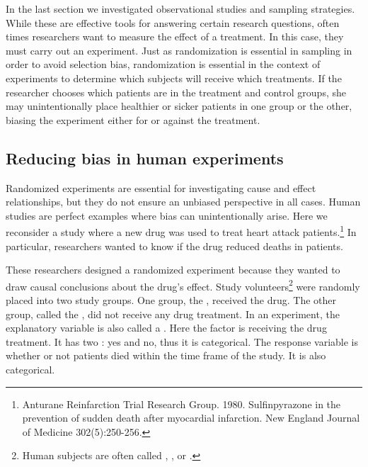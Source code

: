 In the last section we investigated observational studies and sampling strategies. While these are effective tools for answering certain research questions, often times researchers want to measure the effect of a treatment. In this case, they must carry out an experiment. Just as randomization is essential in sampling in order to avoid selection bias, randomization is essential in the context of experiments to determine which subjects will receive which treatments. If the researcher chooses which patients are in the treatment and control groups, she may unintentionally place healthier or sicker patients in one group or the other, biasing the experiment either for or against the treatment.



\subsection{Reducing bias in human experiments}
\label{biasInHumanExperiments}


Randomized experiments are essential for investigating cause and effect relationships, but they do not ensure an unbiased perspective in all cases. Human studies are perfect examples where bias can unintentionally arise. Here we reconsider a study where a new drug was used to treat heart attack patients.\footnote{Anturane Reinfarction Trial Research Group. 1980. Sulfinpyrazone in the prevention of sudden death after myocardial infarction. New England Journal of Medicine 302(5):250-256.} In particular, researchers wanted to know if the drug reduced deaths in patients.

These researchers designed a randomized experiment because they wanted to draw causal conclusions about the drug's effect. Study volunteers\footnote{Human subjects are often called , , or .} were randomly placed into two study groups. One group, the , received the drug. The other group, called the , did not receive any drug treatment. In an experiment, the explanatory variable is also called a . Here the factor is receiving the drug treatment. It has two : yes and no, thus it is categorical. The response variable is whether or not patients died within the time frame of the study. It is also categorical.

